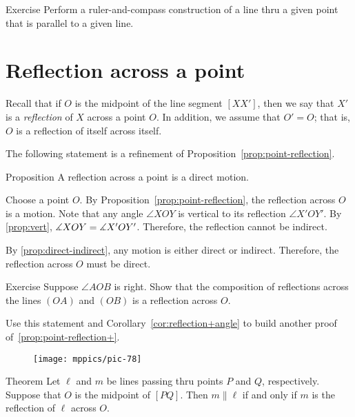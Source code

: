 \begin{thm}{Exercise}\label{ex:construction-parallel}
Perform a ruler-and-compass construction of a line thru a given point that is parallel to a given line.
\end{thm}

\section{Reflection across a point}

Recall that if $O$ is the midpoint of the line segment $[XX']$,
then we say that $X'$ is a \emph{reflection} of $X$ across a point $O$.
In addition, we assume that $O'=O$; that is, $O$ is a reflection of itself across itself.

The following statement is a refinement of Proposition~\ref{prop:point-reflection}.

\begin{thm}[\abs]{Proposition}\label{prop:point-reflection+}
A reflection across a point is a direct motion.
\end{thm}

Choose a point $O$.
By Proposition~\ref{prop:point-reflection}, the reflection across $O$ is a motion.
Note that any angle $\angle XOY$ is vertical to its reflection $\angle X'OY'$.
By \ref{prop:vert}, $\measuredangle XOY=\measuredangle X'OY'$.
Therefore, the reflection cannot be indirect.

By \ref{prop:direct-indirect}, any motion is either direct or indirect.
Therefore, the reflection across $O$ must be direct.
\qeds

\begin{thm}{Exercise}\label{ex:reflections}
Suppose $\angle AOB$ is right.
Show that the composition of reflections across the lines $(OA)$ and $(OB)$ is a reflection across $O$.

Use this statement and Corollary~\ref{cor:reflection+angle} to build another proof of~\ref{prop:point-reflection+}.
\end{thm}

{

\begin{wrapfigure}{r}{23mm}
\vskip-6mm
\centering
\texttt{[image: mppics/pic-78]}
\end{wrapfigure}


\begin{thm}{Theorem}\label{thm:parallel-point-reflection}
Let $\ell$ and $m$ be lines passing thru points $P$ and $Q$, respectively.
Suppose that $O$ is the midpoint of $[PQ]$.
Then $m \parallel \ell$ if and only if $m$ is the reflection of $\ell$ across $O$.
\end{thm}

}

